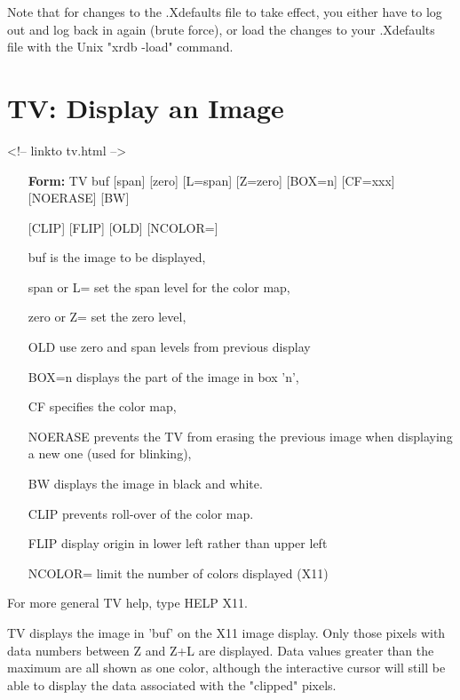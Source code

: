 Note that for changes to the .Xdefaults file to take effect, you either
have to log out and log back in again (brute force), or load the changes to
your .Xdefaults file with the Unix "xrdb -load" command.
 
\section{TV: Display an Image}
\begin{rawhtml}
<!-- linkto tv.html -->
\end{rawhtml}
\begin{itemize}
  \item[\textbf{Form: }TV buf {[span]} {[zero]} {[L=span]} {[Z=zero]} 
       {[BOX=n]} {[CF=xxx]} {[NOERASE]} {[BW]}\hfill]{}
  \item[{[CLIP]} {[FLIP]} {[OLD]} {[NCOLOR=]}\hfill]{}
  \item[buf]{is the image to be displayed,}
  \item[span or L=]{set the span level for the color map,}
  \item[zero or Z=]{set the zero level,}
  \item[OLD]{use zero and span levels from previous display}
  \item[BOX=n]{displays the part of the image in box 'n',}
  \item[CF]{specifies the color map,}
  \item[NOERASE]{prevents the TV from erasing the previous image
       when displaying a new one (used for blinking),}
  \item[BW]{displays the image in black and white.}
  \item[CLIP]{prevents roll-over of the color map.}
  \item[FLIP]{display origin in lower left rather than upper left}
  \item[NCOLOR=]{limit the number of colors displayed (X11)}
\end{itemize}

For more general TV help, type HELP X11.

TV displays the image in 'buf' on the X11 image display.  Only those pixels
with data numbers between Z and Z+L are displayed.  Data values greater
than the maximum are all shown as one color, although the interactive
cursor will still be able to display the data associated with the "clipped"
pixels.
 
